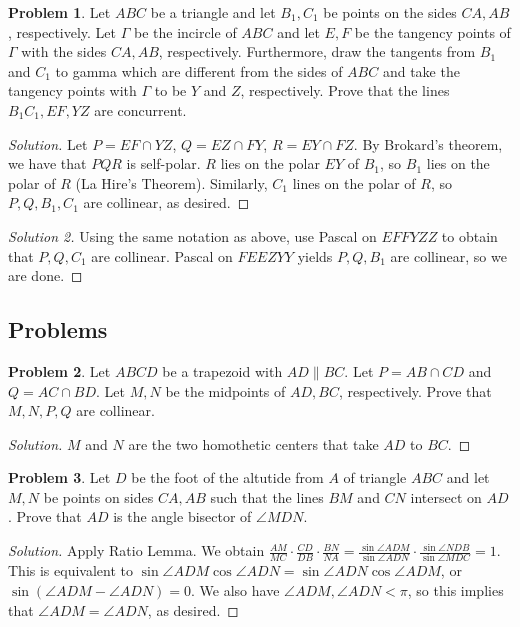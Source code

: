 \documentclass[a4paper]{article}
\theoremstyle{definition}
\newtheorem{problem}{Problem}[subsection]
\begin{document}
\begin{problem}
Let $ABC$ be a triangle and let $B_1, C_1$ be points on the sides $CA, AB$, respectively. Let $\Gamma$ be the incircle of $ABC$ and let $E, F$ be the tangency points of $\Gamma$ with the sides $CA, AB$, respectively. Furthermore, draw the tangents from $B_1$ and $C_1$ to gamma which are different from the sides of $ABC$ and take the tangency points with $\Gamma$ to be $Y$ and $Z$, respectively. Prove that the lines $B_1C_1, EF, YZ$ are concurrent.
\end{problem}

\begin{proof}[Solution]
Let $P = EF \cap YZ$, $Q = EZ \cap FY$, $R = EY \cap FZ$. By Brokard's theorem, we have that $PQR$ is self-polar. $R$ lies on the polar $EY$ of $B_1$, so $B_1$ lies on the polar of $R$ (La Hire's Theorem). Similarly, $C_1$ lines on the polar of $R$, so $P, Q, B_1, C_1$ are collinear, as desired.
\end{proof}

\begin{proof}[Solution 2]
Using the same notation as above, use Pascal on $EFFYZZ$ to obtain that $P, Q, C_1$ are collinear. Pascal on $FEEZYY$ yields $P, Q, B_1$ are collinear, so we are done.
\end{proof}

\subsection{Problems}

\begin{problem}
Let $ABCD$ be a trapezoid with $AD \parallel BC$. Let $P = AB \cap CD$ and $Q = AC \cap BD$. Let $M, N$ be the midpoints of $AD, BC$, respectively. Prove that $M, N, P, Q$ are collinear.
\end{problem}

\begin{proof}[Solution]
$M$ and $N$ are the two homothetic centers that take $AD$ to $BC$.
\end{proof}

\begin{problem}
Let $D$ be the foot of the altutide from $A$ of triangle $ABC$ and let $M, N$ be points on sides $CA, AB$ such that the lines $BM$ and $CN$ intersect on $AD$. Prove that $AD$ is the angle bisector of $\angle MDN$.
\end{problem}

\begin{proof}[Solution]
Apply Ratio Lemma. We obtain $\frac{AM}{MC} \cdot \frac{CD}{DB} \cdot \frac{BN}{NA} = \frac{\sin \angle ADM}{\sin \angle ADN} \cdot \frac{\sin \angle NDB}{\sin \angle MDC} = 1$. This is equivalent to $\sin \angle ADM \cos \angle ADN = \sin \angle ADN \cos \angle ADM$, or $\sin \left(\angle ADM - \angle ADN\right) = 0$. We also have $\angle ADM, \angle ADN < \pi$, so this implies that $\angle ADM = \angle ADN$, as desired.
\end{proof}
\end{document}
